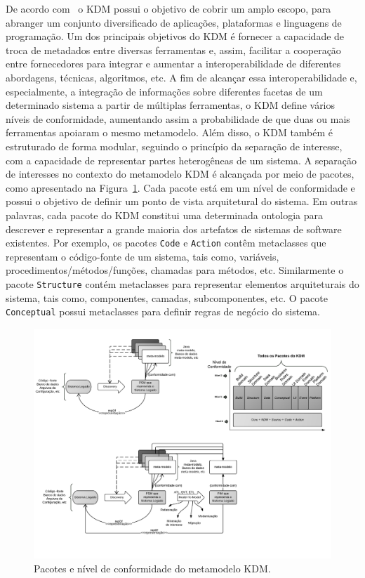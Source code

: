 De acordo com~ o KDM possui o objetivo de cobrir um amplo escopo, para abranger um conjunto diversificado de aplicações, plataformas e linguagens de programação. Um dos principais objetivos do KDM é fornecer a capacidade de troca de metadados entre diversas ferramentas e, assim, facilitar a cooperação entre fornecedores para integrar e aumentar a interoperabilidade de diferentes abordagens, técnicas, algoritmos, etc. A fim de alcançar essa interoperabilidade e, especialmente, a integração de informações sobre diferentes facetas de um determinado sistema a partir de múltiplas ferramentas, o KDM define vários níveis de conformidade, aumentando assim a probabilidade de que duas ou mais ferramentas apoiaram o mesmo metamodelo. Além disso, o KDM também é estruturado de forma modular, seguindo o princípio da separação de interesse, com a capacidade de representar partes heterogêneas de um sistema. A separação de interesses no contexto do metamodelo KDM é alcançada por meio de pacotes, como apresentado na Figura~\ref{kdm:domain}. Cada pacote está em um nível de conformidade e possui o objetivo de definir um ponto de vista arquitetural do sistema. Em outras palavras, cada pacote do KDM constitui uma determinada ontologia para descrever e representar a grande maioria dos artefatos de sistemas de software existentes. Por exemplo, os pacotes \texttt{Code} e \texttt{Action} contêm metaclasses que representam o código-fonte de um sistema, tais como, variáveis, procedimentos/métodos/funções, chamadas para métodos, etc. Similarmente o pacote \texttt{Structure} contém metaclasses para representar elementos arquiteturais do sistema, tais como, componentes, camadas, subcomponentes, etc. O pacote \texttt{Conceptual} possui  metaclasses para definir regras de negócio do sistema.


\begin{figure}[htb]
 \caption{Pacotes e nível de conformidade do metamodelo KDM.}
 \label{kdm:domain}
 \centering
 \includegraphics[scale=1]{images/kdmLevels_pacotes.pdf}
\end{figure}

